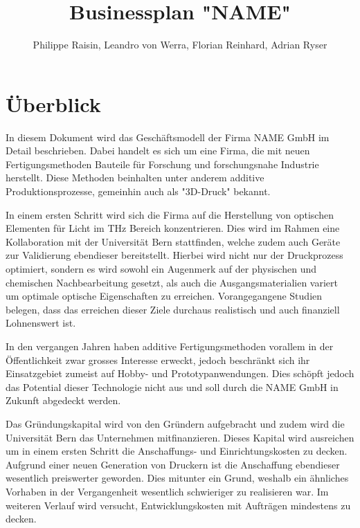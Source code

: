 \documentclass[12pt]{article}
\begin{document}
\title{Businessplan "NAME"}
\author{Philippe Raisin, Leandro von Werra, Florian Reinhard, Adrian Ryser}
\maketitle
\tableofcontents
\newpage



\section{Überblick}
In diesem Dokument wird das Geschäftsmodell der Firma NAME GmbH im Detail beschrieben. Dabei handelt es sich um eine Firma, die mit neuen Fertigungsmethoden Bauteile für Forschung und forschungsnahe Industrie herstellt. Diese Methoden beinhalten unter anderem additive Produktionsprozesse, gemeinhin auch als "3D-Druck" bekannt. 

In einem ersten Schritt wird sich die Firma auf die Herstellung von optischen Elementen für Licht im THz Bereich konzentrieren. Dies wird im Rahmen eine Kollaboration mit der Universität Bern stattfinden, welche zudem auch Geräte zur Validierung ebendieser bereitstellt. Hierbei wird nicht nur der Druckprozess optimiert, sondern es wird sowohl ein Augenmerk auf der physischen und chemischen Nachbearbeitung gesetzt, als auch die Ausgangsmaterialien variert um optimale optische Eigenschaften zu erreichen. Vorangegangene Studien belegen, dass das erreichen dieser Ziele durchaus realistisch und auch finanziell Lohnenswert ist.

In den vergangen Jahren haben additive Fertigungsmethoden vorallem in der Öffentlichkeit zwar grosses Interesse erweckt, jedoch beschränkt sich ihr Einsatzgebiet zumeist auf Hobby- und Prototypanwendungen. Dies schöpft jedoch das Potential dieser Technologie nicht aus und soll durch die NAME GmbH in Zukunft abgedeckt werden.

Das Gründungskapital wird von den Gründern aufgebracht und zudem wird die Universität Bern das Unternehmen mitfinanzieren. Dieses Kapital wird ausreichen um in einem ersten Schritt die Anschaffungs- und Einrichtungskosten zu decken. Aufgrund einer neuen Generation von Druckern ist die Anschaffung ebendieser wesentlich preiswerter geworden. Dies mitunter ein Grund, weshalb ein ähnliches Vorhaben in der Vergangenheit wesentlich schwieriger zu realisieren war. Im weiteren Verlauf wird versucht, Entwicklungskosten mit Aufträgen mindestens zu decken.
\end{document}

